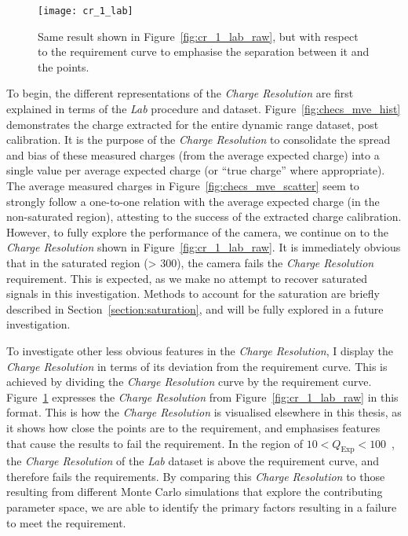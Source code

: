 \begin{figure}
	\centering
    \texttt{[image: cr\_1\_lab]} 
	\caption[\textit{Charge Resolution} of the Lab dataset with respect to the requirement.]{Same result shown in Figure~\ref{fig:cr_1_lab_raw}, but with respect to the requirement curve to emphasise the separation between it and the points.}
	\label{fig:cr_1_lab}
\end{figure}

To begin, the different representations of the \textit{Charge Resolution} are first explained in terms of the \textit{Lab} procedure and dataset. Figure~\ref{fig:checs_mve_hist} demonstrates the charge extracted for the entire dynamic range dataset, post calibration. It is the purpose of the \textit{Charge Resolution} to consolidate the spread and bias of these measured charges (from the average expected charge) into a single value per average expected charge (or ``true charge'' where appropriate). The average measured charges in Figure~\ref{fig:checs_mve_scatter} seem to strongly follow a one-to-one relation with the average expected charge (in the non-saturated region), attesting to the success of the extracted charge calibration. However, to fully explore the performance of the camera, we continue on to the \textit{Charge Resolution} shown in Figure~\ref{fig:cr_1_lab_raw}. It is immediately obvious that in the saturated region (\SI{> 300}{\pe}), the camera fails the \textit{Charge Resolution} requirement. This is expected, as we make no attempt to recover saturated signals in this investigation. Methods to account for the saturation are briefly described in Section~\ref{section:saturation}, and will be fully explored in a future investigation. 

To investigate other less obvious features in the \textit{Charge Resolution}, I display the \textit{Charge Resolution} in terms of its deviation from the requirement curve. This is achieved by dividing the \textit{Charge Resolution} curve by the requirement curve. Figure~\ref{fig:cr_1_lab} expresses the \textit{Charge Resolution} from Figure~\ref{fig:cr_1_lab_raw} in this format. This is how the \textit{Charge Resolution} is visualised elsewhere in this thesis, as it shows how close the points are to the requirement, and emphasises features that cause the results to fail the requirement. In the region of $10 < Q_\text{Exp} < 100$~\si{\pe}, the \textit{Charge Resolution} of the \textit{Lab} dataset is above the requirement curve, and therefore fails the requirements. By comparing this \textit{Charge Resolution} to those resulting from different Monte Carlo simulations that explore the contributing parameter space, we are able to identify the primary factors resulting in a failure to meet the requirement.

